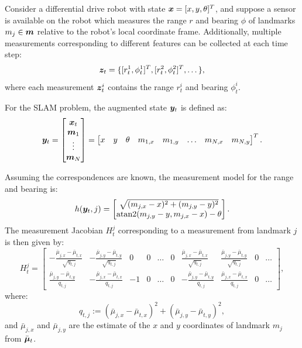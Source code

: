 \begin{example} \label{ex:rangeandbearingEKFSLAM}
\theoremstyle{definition}
Consider a differential drive robot with state $\bm{x} = [x, y, \theta]^T$, and suppose a sensor is available on the robot which measures the range $r$ and bearing $\phi$ of landmarks $m_j \in \bm{m}$ relative to the robot’s local coordinate frame. Additionally, multiple measurements corresponding to different features can be collected at each time step:
\begin{equation*}
\bm{z}_t = \{[r_t^1,\phi_t^1]^T, [r_t^2,\phi_t^2]^T, \dots\},
\end{equation*}
where each measurement $\bm{z}_t^i$ contains the range $r_t^i$ and bearing $\phi_t^i$. 

For the SLAM problem, the augmented state $\bm{y}_t$ is defined as:
\begin{equation*}
\bm{y}_t =
    \begin{bmatrix}
    \bm{x}_t \\
    \bm{m}_1 \\ \vdots \\ \bm{m}_N
    \end{bmatrix}
    = \begin{bmatrix}
    x & y & \theta & m_{1,x} &m_{1,y} & \dots & m_{N,x} &m_{N,y}
    \end{bmatrix}^T.
\end{equation*}

Assuming the correspondences are known, the measurement model for the range and bearing is:
\begin{equation}
h(\bm{y}_t, j)  = \begin{bmatrix}
\sqrt{(m_{j,x} - x)^{2} + (m_{j,y}- y)^{2}} \\
\text{atan2}(m_{j,y}- y, m_{j,x} - x) - \theta
\end{bmatrix}.
\end{equation}
The measurement Jacobian $H^j_t$ corresponding to a measurement from landmark $j$ is then given by:
\begin{equation}
H^j_t = \begin{bmatrix}
-\frac{\bar{\mu}_{j,x} - \bar{\mu}_{t,x}}{\sqrt{q_{t,j}}} & -\frac{\bar{\mu}_{j,y} - \bar{\mu}_{t,y}}{\sqrt{q_{t,j}}} & 0 & 0 & \dots & 0 & \frac{\bar{\mu}_{j,x} - \bar{\mu}_{t,x}}{\sqrt{q_{t,j}}} & \frac{\bar{\mu}_{j,y} - \bar{\mu}_{t,y}}{\sqrt{q_{t,j}}} & 0 & \dots \\
\frac{\bar{\mu}_{j,y} - \bar{\mu}_{t,y}}{q_{t,j}} & -\frac{\bar{\mu}_{j,x} - \bar{\mu}_{t,x}}{q_{t,j}} & -1 & 0 & \dots & 0 & -\frac{\bar{\mu}_{j,y} - \bar{\mu}_{t,y}}{q_{t,j}} & \frac{\bar{\mu}_{j,x} - \bar{\mu}_{t,x}}{q_{t,j}} & 0 & \dots 
\end{bmatrix},
\end{equation}
where:
\begin{equation*}
    q_{t,j} := (\bar{\mu}_{j,x} - \bar{\mu}_{t,x})^{2} + (\bar{\mu}_{j,y} - \bar{\mu}_{t,y})^{2},
\end{equation*}
and $\bar{\mu}_{j,x}$ and $\bar{\mu}_{j,y}$ are the estimate of the $x$ and $y$ coordinates of landmark $m_j$ from $\bar{\bm{\mu}}_t$.


\end{example}
